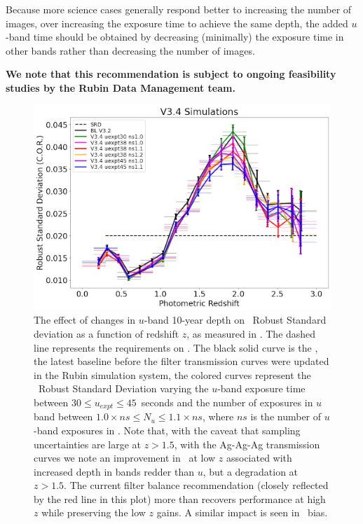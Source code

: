 Because more science cases generally respond better to increasing the number of images, over increasing the exposure time to achieve the same depth, the added $u$-band time should be obtained by decreasing (minimally) the exposure time in other bands rather than decreasing the number of images.

\textbf{ We note that this recommendation is subject to ongoing feasibility studies by the Rubin Data 
Management team.}

\begin{figure}
  \centering
 \includegraphics[height=0.6\textwidth]{figures/photo-z.png}

\caption{The effect of changes in $u$-band 10-year depth on \pz\ Robust Standard deviation as a function of redshift $z$, as measured in \cite{Graham_2017}. The dashed line represents the  requirements on \pz. The black solid curve is the , the latest baseline before the filter transmission curves were updated in the Rubin simulation system, the colored curves represent the \pz\ Robust Standard Deviation varying the  $u$-band exposure time between $30\leq u_{expt} \leq45$~seconds and the number of exposures in $u$ band between $1.0\times ns \leq N_u \leq 1.1\times ns$, where $ns$ is the number of $u$-band exposures in . Note that, with the caveat that sampling uncertainties are large at $z>1.5$, with the Ag-Ag-Ag transmission curves we note an improvement in \pz\ at low $z$ associated with increased depth in bands redder than $u$, but a degradation at $z>1.5$. The current filter balance recommendation (closely reflected by the red line in this plot) more than recovers performance at high $z$ while preserving the low $z$ gains. A similar impact is seen in \pz\ bias.}
\label{fig:pz}
\end{figure}

